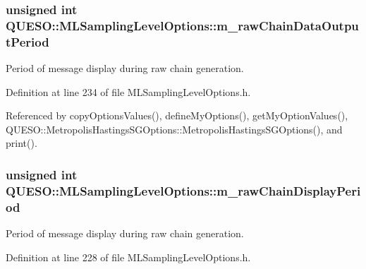 \hypertarget{class_q_u_e_s_o_1_1_m_l_sampling_level_options_a8fdb68e6d3e91f0334293f2ee009aded}{
\subsubsection[{m\-\_\-raw\-Chain\-Data\-Output\-Period}]{\setlength{\rightskip}{0pt plus 5cm}unsigned int Q\-U\-E\-S\-O\-::\-M\-L\-Sampling\-Level\-Options\-::m\-\_\-raw\-Chain\-Data\-Output\-Period}}\label{class_q_u_e_s_o_1_1_m_l_sampling_level_options_a8fdb68e6d3e91f0334293f2ee009aded}


Period of message display during raw chain generation. 



Definition at line 234 of file M\-L\-Sampling\-Level\-Options.\-h.



Referenced by copy\-Options\-Values(), define\-My\-Options(), get\-My\-Option\-Values(), Q\-U\-E\-S\-O\-::\-Metropolis\-Hastings\-S\-G\-Options\-::\-Metropolis\-Hastings\-S\-G\-Options(), and print().

\hypertarget{class_q_u_e_s_o_1_1_m_l_sampling_level_options_a6d0e080a6b428a8e6c8fed14c597c883}{
\subsubsection[{m\-\_\-raw\-Chain\-Display\-Period}]{\setlength{\rightskip}{0pt plus 5cm}unsigned int Q\-U\-E\-S\-O\-::\-M\-L\-Sampling\-Level\-Options\-::m\-\_\-raw\-Chain\-Display\-Period}}\label{class_q_u_e_s_o_1_1_m_l_sampling_level_options_a6d0e080a6b428a8e6c8fed14c597c883}


Period of message display during raw chain generation. 



Definition at line 228 of file M\-L\-Sampling\-Level\-Options.\-h.



